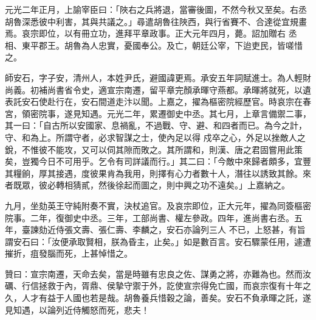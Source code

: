\begin{pinyinscope}
 元光二年正月，上諭宰臣曰：「陜右之兵將退，當審後圖，不然今秋又至矣。右丞胡魯深悉彼中利害，其與共議之。」尋遣胡魯往陜西，與行省賽不、合達從宜規畫焉。哀宗即位，以有冊立功，進拜平章政事。正大元年四月，薨。詔加贈右
 丞相、東平郡王。胡魯為人忠實，憂國奉公。及亡，朝廷公宰，下迨吏民，皆嗟惜之。



 師安石，字子安，清州人，本姓尹氏，避國諱更焉。承安五年詞賦進士。為人輕財尚義。初補尚書省令史，適宣宗南遷，留平章完顏承暉守燕都。承暉將就死，以遺表託安石使赴行在，安石間道走汴以聞。上嘉之，擢為樞密院經歷官。時哀宗在春宮，領密院事，遂見知遇。元光二年，累遷御史中丞。其七月，上章言備禦二事，其一曰：「自古所以安國家、息禍亂，不過戰、守、避、和四者而已。為今之計，守、和為上。所謂守者，必求智謀之士，使內足以得
 戍卒之心，外足以挫敵人之銳，不惟彼不能攻，又可以伺其隙而敗之。其所謂和，則漢、唐之君固嘗用此策矣，豈獨今日不可用乎。乞令有司詳議而行。」其二曰：「今敵中來歸者頗多，宜豐其糧餉，厚其接遇，度彼果肯為我用，則擇有心力者數十人，潛往以誘致其餘。來者既眾，彼必轉相猜貳，然後徐起而圖之，則中興之功不遠矣。」上嘉納之。



 九月，坐劾英王守純附奏不實，決杖追官。及哀宗即位，正大元年，擢為同簽樞密院事。二年，復御史中丞。三年，工部尚書、權左參政。四年，進尚書右丞。五年，臺諫劾近侍張文壽、張仁壽、李麟之，安石亦論列三人
 不已，上怒甚，有旨謂安石曰：「汝便承取賢相，朕為昏主，止矣。」如是數百言。安石驟蒙任用，遽遭摧折，疽發腦而死，上甚悼惜之。



 贊曰：宣宗南遷，天命去矣，當是時雖有忠良之佐、謀勇之將，亦難為也。然而汝礪、行信拯救于內，胥鼎、侯摯守禦于外，訖使宣宗得免亡國，而哀宗復有十年之久，人才有益于人國也若是哉。胡魯養兵惜穀之論，善矣。安石不負承暉之託，遂見知遇，以論列近侍觸怒而死，悲夫！



\end{pinyinscope}